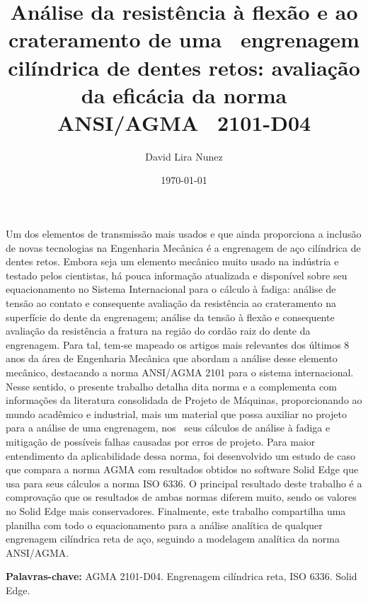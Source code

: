 \documentclass[12pt,a4paper]{article}
\renewenvironment{abstract}
  {{\bfseries\noindent{\abstractname}\par\nobreak}\footnotesize}
  {\bigskip}
\begin{document}
\title{Análise da resistência à flexão e ao crateramento de uma~ engrenagem
cilíndrica de dentes retos: avaliação da eficácia da norma ANSI/AGMA~
2101-D04}

\author[1]{David Lira Nunez}%
%

\vspace{-1em}

\date{\today}

\begingroup
\let\center\flushleft
\let\endcenter\endflushleft
\maketitle
\endgroup

\begin{abstract}
Um dos elementos de transmissão mais usados e que ainda proporciona a
inclusão de novas tecnologias na Engenharia Mecânica é a engrenagem de
aço cilíndrica de dentes retos. Embora seja um elemento mecânico muito
usado na indústria e testado pelos cientistas, há pouca informação
atualizada e disponível sobre seu equacionamento no Sistema
Internacional para o cálculo à fadiga: análise de tensão ao contato e
consequente avaliação da resistência ao crateramento na superfície do
dente da engrenagem; análise da tensão à flexão e consequente avaliação
da resistência a fratura na região do cordão raiz do dente da
engrenagem. Para tal, tem-se mapeado os artigos mais relevantes dos
últimos 8 anos da área de Engenharia Mecânica que abordam a análise
desse elemento mecânico, destacando a norma ANSI/AGMA 2101 para o
sistema internacional. Nesse sentido, o presente trabalho detalha dita
norma e a complementa com informações da literatura consolidada de
Projeto de Máquinas, proporcionando ao mundo acadêmico e industrial,
mais um material que possa auxiliar no projeto para a análise de uma
engrenagem, nos~ seus cálculos de análise à fadiga e mitigação de
possíveis falhas causadas por erros de projeto. Para maior entendimento
da aplicabilidade dessa norma, foi desenvolvido um estudo de caso que
compara a norma AGMA com resultados obtidos no software Solid Edge que
usa para seus cálculos a norma ISO 6336. O principal resultado deste
trabalho é a comprovação que os resultados de ambas normas diferem
muito, sendo os valores no Solid Edge mais conservadores. Finalmente,
este trabalho compartilha uma planilha com todo o equacionamento para a
análise analítica de qualquer engrenagem cilíndrica reta de aço,
seguindo a modelagem analítica da norma ANSI/AGMA.

\textbf{Palavras-chave:} AGMA 2101-D04. Engrenagem cilíndrica reta, ISO
6336. Solid Edge.%
\end{abstract}%
\end{document}
